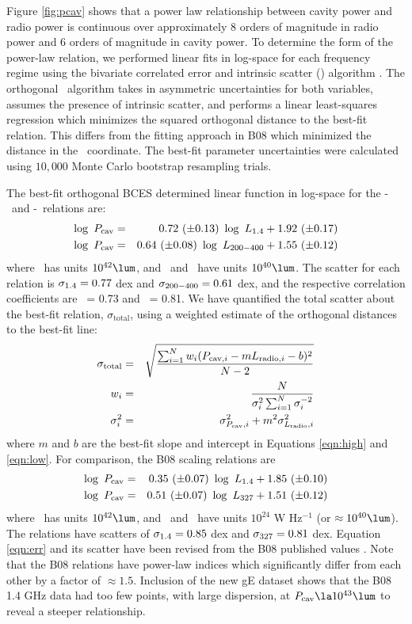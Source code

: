 \documentclass{emulateapj}
\begin{document}
Figure \ref{fig:pcav} shows that a power law relationship between
cavity power and radio power is continuous over approximately 8 orders
of magnitude in radio power and 6 orders of magnitude in cavity
power. To determine the form of the power-law relation, we performed
linear fits in log-space for each frequency regime using the bivariate
correlated error and intrinsic scatter (\bces) algorithm
\citep{bces}. The orthogonal \bces\ algorithm takes in asymmetric
uncertainties for both variables, assumes the presence of intrinsic
scatter, and performs a linear least-squares regression which
minimizes the squared orthogonal distance to the best-fit
relation. This differs from the fitting approach in B08 which
minimized the distance in the \pcav\ coordinate. The best-fit
parameter uncertainties were calculated using $10,000$ Monte Carlo
bootstrap resampling trials.

The best-fit orthogonal BCES determined linear function in log-space
for the \pcav-\phigh\ and \pcav-\plow\ relations are:
\begin{eqnarray}
  \log~P_{\mathrm{cav}} &=& 0.72~(\pm 0.13)~\log~L_{\mathrm{1.4}} + 1.92~(\pm 0.17) \label{eqn:high}\\
  \log~P_{\mathrm{cav}} &=& 0.64~(\pm 0.08)~\log~L_{\mathrm{200-400}} + 1.55~(\pm 0.12) \label{eqn:low}
\end{eqnarray}
where \pcav\ has units $10^{42} \lum$, and \phigh\ and \plow\ have
units $10^{40} \lum$. The scatter for each relation is $\sigma_{\mathrm{1.4}} = 0.77$
dex and $\sigma_{\mathrm{200-400}} = 0.61$ dex, and the respective correlation
coefficients are \rhigh\ = 0.73 and \rlow\ = 0.81. We have quantified
the total scatter about the best-fit relation,
$\sigma_{\mathrm{total}}$, using a weighted estimate of the orthogonal
distances to the best-fit line:
\begin{eqnarray}
  \sigma_{\mathrm{total}} &=& \sqrt{\frac{\sum_{i=1}^N w_i (P_{\mathrm{cav},i}-m L_{\mathrm{radio},i}-b)^2}{N-2}} \nonumber \\
  w_i &=& \frac{N}{\sigma_i^2 \sum_{i=1}^N \sigma_i^{-2}} \nonumber \\
  \sigma_i^2 &=& \sigma_{P_{\mathrm{cav}},i}^2 + m^2 \sigma_{L_{\mathrm{radio}},i}^2 \nonumber
\end{eqnarray}
where $m$ and $b$ are the best-fit slope and intercept in Equations
\ref{eqn:high} and \ref{eqn:low}. For comparison, the B08 scaling
relations are
\begin{eqnarray}
  \log~P_{\mathrm{cav}} &=& 0.35~(\pm 0.07)~\log~L_{\mathrm{1.4}} + 1.85~(\pm 0.10) \label{eqn:err}\\
  \log~P_{\mathrm{cav}} &=& 0.51~(\pm 0.07)~\log~L_{\mathrm{327}} + 1.51~(\pm 0.12)
\end{eqnarray}
where \pcav\ has units $10^{42} \lum$, and \phigh\ and \pthree\ have
units $10^{24}$ W Hz$^{-1}$ (or $\approx 10^{40} \lum$). The relations
have scatters of $\sigma_{\mathrm{1.4}} = 0.85$ dex and $\sigma_{\mathrm{327}} = 0.81$
dex. Equation \ref{eqn:err} and its scatter have been revised from the
B08 published values \citep{birzan08err}. Note that the B08 relations
have power-law indices which significantly differ from each other by a
factor of $\approx 1.5$. Inclusion of the new gE dataset shows that
the B08 1.4 GHz data had too few points, with large dispersion, at
$\pcav \la 10^{43} \lum$ to reveal a steeper relationship.
\end{document}
